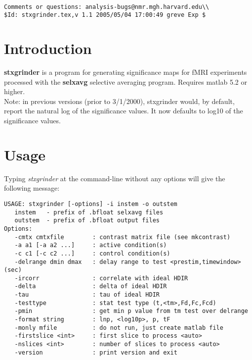 \documentclass[10pt]{article}
\begin{document}
\begin{Large}
 \\
\end{Large}

\noindent 
\begin{verbatim}
Comments or questions: analysis-bugs@nmr.mgh.harvard.edu\\
$Id: stxgrinder.tex,v 1.1 2005/05/04 17:00:49 greve Exp $
\end{verbatim}

\section{Introduction}
{\bf stxgrinder} is a program for generating significance maps for
fMRI experiments processed with the {\bf selxavg} selective averaging
program.  Requires matlab 5.2 or higher.\\

Note: in previous versions (prior to 3/1/2000), stxgrinder would, by
default, report the natural log of the significance values.  It now
defaults to log10 of the significance values.

\section{Usage}
Typing {\em stxgrinder} at the command-line without any options will give the
following message:\\ 

\begin{small}
\begin{verbatim}
USAGE: stxgrinder [-options] -i instem -o outstem
   instem   - prefix of .bfloat selxavg files
   outstem  - prefix of .bfloat output files
Options:
   -cmtx cmtxfile        : contrast matrix file (see mkcontrast)
   -a a1 [-a a2 ...]     : active condition(s)
   -c c1 [-c c2 ...]     : control condition(s)
   -delrange dmin dmax   : delay range to test <prestim,timewindow> (sec)
   -ircorr               : correlate with ideal HDIR
   -delta                : delta of ideal HDIR
   -tau                  : tau of ideal HDIR
   -testtype             : stat test type (t,<tm>,Fd,Fc,Fcd)
   -pmin                 : get min p value from tm test over delrange
   -format string        : lnp, <log10p>, p, tF
   -monly mfile          : do not run, just create matlab file
   -firstslice <int>     : first slice to process <auto>
   -nslices <int>        : number of slices to process <auto>
   -version              : print version and exit
\end{verbatim}
\end{small}
\end{document}
